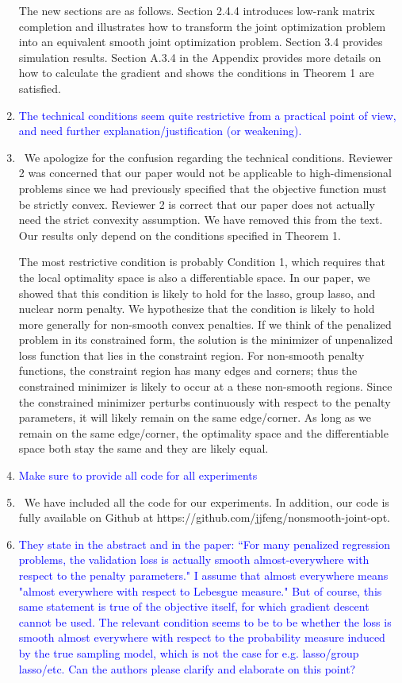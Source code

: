\documentclass[]{article}
\newcommand{\point}[1]{\item \textcolor{blue}{#1}}
\newcommand{\reply}{\item[]\ }
\begin{document}
\begin{enumerate}
		The new sections are as follows. Section 2.4.4 introduces low-rank matrix completion and illustrates how to transform the joint optimization problem into an equivalent smooth joint optimization problem. Section 3.4 provides simulation results. Section A.3.4 in the Appendix provides more details on how to calculate the gradient and shows the conditions in Theorem 1 are satisfied. 
		
		
		\point{The technical conditions seem quite restrictive from a practical point of view, and need further explanation/justification (or weakening).}
		
		\reply We apologize for the confusion regarding the technical conditions. Reviewer 2 was concerned that our paper would not be applicable to high-dimensional problems since we had previously specified that the objective function must be strictly convex. Reviewer 2 is correct that our paper does not actually need the strict convexity assumption. We have removed this from the text. Our results only depend on the conditions specified in Theorem 1. 
		
		The most restrictive condition is probably Condition 1, which requires that the local optimality space is also a differentiable space. In our paper, we showed that this condition is likely to hold for the lasso, group lasso, and nuclear norm penalty. We hypothesize that the condition is likely to hold more generally for non-smooth convex penalties. If we think of the penalized problem in its constrained form, the solution is the minimizer of unpenalized loss function that lies in the constraint region. For non-smooth penalty functions, the constraint region has many edges and corners; thus the constrained minimizer is likely to occur at a these non-smooth regions. Since the constrained minimizer perturbs continuously with respect to the penalty parameters, it will likely remain on the same edge/corner. As long as we remain on the same edge/corner, the optimality space and the differentiable space both stay the same and they are likely equal.
		
		\point{Make sure to provide all code for all experiments}
		
		\reply We have included all the code for our experiments. In addition, our code is fully available on Github at https://github.com/jjfeng/nonsmooth-joint-opt.
		
		\point{They state in the abstract and in the paper: ``For many penalized regression problems, the validation loss is actually smooth almost-everywhere with respect to the penalty parameters."  I assume that almost everywhere means "almost everywhere with respect to Lebesgue measure."  But of course, this same statement is true of the objective itself, for which gradient descent cannot be used.  The relevant condition seems to be to be whether the loss is smooth almost everywhere with respect to the probability measure induced by the true sampling model, which is not the case for e.g. lasso/group lasso/etc.  Can the authors please clarify and elaborate on this point?}
		

\end{enumerate}
\end{document}
